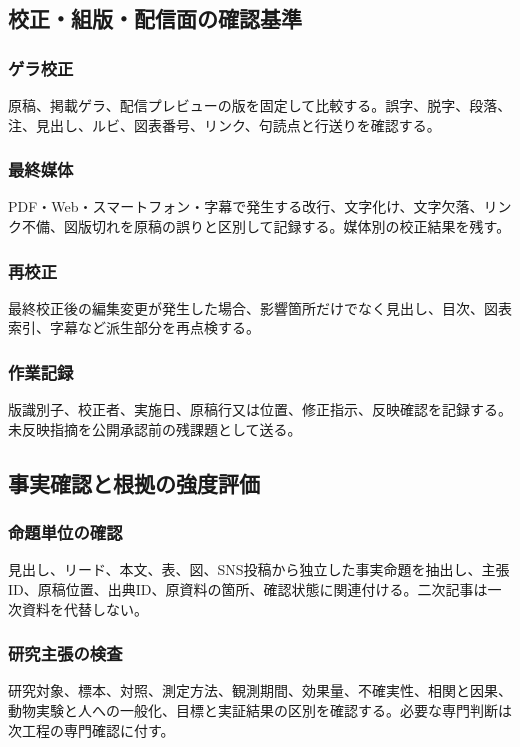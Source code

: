 \documentclass[a4paper,11pt]{article}
\begin{document}
\subsection{校正・組版・配信面の確認基準}
\subsubsection{ゲラ校正}
\par 原稿、掲載ゲラ、配信プレビューの版を固定して比較する。誤字、脱字、段落、注、見出し、ルビ、図表番号、リンク、句読点と行送りを確認する。\par\medskip
\subsubsection{最終媒体}
\par PDF・Web・スマートフォン・字幕で発生する改行、文字化け、文字欠落、リンク不備、図版切れを原稿の誤りと区別して記録する。媒体別の校正結果を残す。\par\medskip
\subsubsection{再校正}
\par 最終校正後の編集変更が発生した場合、影響箇所だけでなく見出し、目次、図表索引、字幕など派生部分を再点検する。\par\medskip
\subsubsection{作業記録}
\par 版識別子、校正者、実施日、原稿行又は位置、修正指示、反映確認を記録する。未反映指摘を公開承認前の残課題として送る。\par\medskip
\subsection{事実確認と根拠の強度評価}
\subsubsection{命題単位の確認}
\par 見出し、リード、本文、表、図、SNS投稿から独立した事実命題を抽出し、主張ID、原稿位置、出典ID、原資料の箇所、確認状態に関連付ける。二次記事は一次資料を代替しない。\par\medskip
\subsubsection{研究主張の検査}
\par 研究対象、標本、対照、測定方法、観測期間、効果量、不確実性、相関と因果、動物実験と人への一般化、目標と実証結果の区別を確認する。必要な専門判断は次工程の専門確認に付す。\par\medskip
\end{document}
